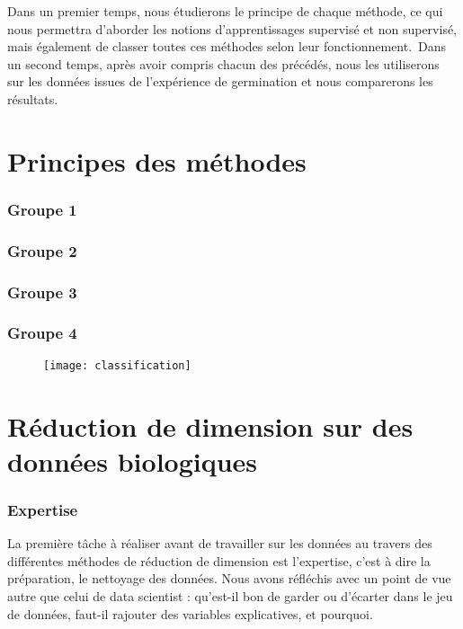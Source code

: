 \documentclass[12pt]{report}
\begin{document}
Dans un premier temps, nous étudierons le principe de chaque méthode, ce qui nous permettra d'aborder les notions d'apprentissages supervisé et non supervisé, mais également de classer toutes ces méthodes selon leur fonctionnement.\
Dans un second temps, après avoir compris chacun des précédés, nous les utiliserons sur les données issues de l'expérience de germination et nous comparerons les résultats.


\part{Principes des méthodes}

\section{Groupe 1}

\section{Groupe 2}

\section{Groupe 3}

\section{Groupe 4}

\begin{figure}[H] 
\centerline{\texttt{[image: classification]}}
\end{figure}


\part{Réduction de dimension sur des données biologiques}

\section{Expertise}

La première tâche à réaliser avant de travailler sur les données au travers des différentes méthodes de réduction de dimension est l'expertise, c'est à dire la préparation, le nettoyage des données. Nous avons réfléchis avec un point de vue
autre que celui de data scientist : qu'est-il bon de garder ou d'écarter dans le jeu de données, faut-il rajouter des variables explicatives, et pourquoi.\\
\end{document}
